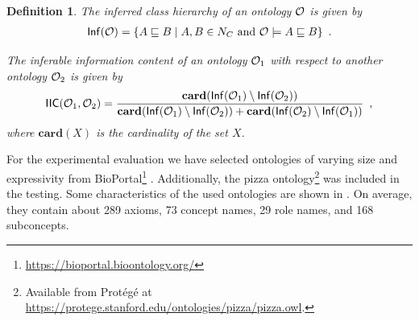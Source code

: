 \documentclass[
]{ceurart}
\newtheorem{definition}{Definition}
\begin{document}
\begin{definition}
  The \emph{inferred class hierarchy} of an ontology $\mathcal{O}$ is given by
  \begin{align*}
    {\ensuremath{\mathsf{Inf}}}(\mathcal{O}) = \{ A \sqsubseteq B \mid A, B \in N_C \text{ and } \mathcal{O} \models A \sqsubseteq B \} \enspace.
  \end{align*}

  The \emph{inferable information content} of an ontology $\mathcal{O}_1$ with respect to another ontology $\mathcal{O}_2$ is given by
  \begin{align*}
    {\ensuremath{\mathsf{IIC}}}(\mathcal{O}_1, \mathcal{O}_2) = \frac{\mathbf{card}({\mathsf{Inf}}(\mathcal{O}_1) \setminus {\ensuremath{\mathsf{Inf}}}(\mathcal{O}_2))}{\mathbf{card}({\mathsf{Inf}}(\mathcal{O}_1) \setminus {\ensuremath{\mathsf{Inf}}}(\mathcal{O}_2)) + \mathbf{card}({\mathsf{Inf}}(\mathcal{O}_2) \setminus {\ensuremath{\mathsf{Inf}}}(\mathcal{O}_1))} \enspace,
  \end{align*}
  where $\mathbf{card}(X)$ is the cardinality of the set $X$.
\end{definition}

For the experimental evaluation we have selected ontologies of varying size and expressivity from BioPortal\footnote{\url{https://bioportal.bioontology.org/}} \cite{whetzel2011bioportal}. Additionally, the pizza ontology\footnote{Available from Protégé at \url{https://protege.stanford.edu/ontologies/pizza/pizza.owl}.} was included in the testing. Some characteristics of the used ontologies are shown in . On average, they contain about 289 axioms, 73 concept names, 29 role names, and 168 subconcepts.
\end{document}

